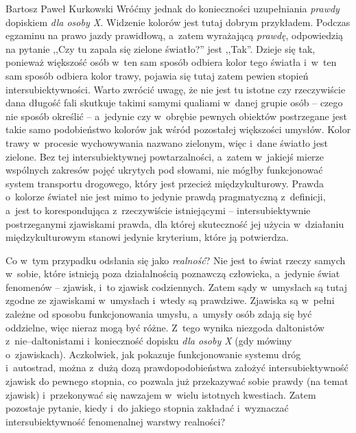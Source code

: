 \begin{artplenv}{Bartosz Paweł Kurkowski}
Wróćmy jednak do konieczności uzupełniania \textit{prawdy} dopiskiem \textit{dla osoby X.} Widzenie kolorów jest tutaj
dobrym przykładem. Podczas egzaminu na prawo jazdy prawidłową, a~zatem wyrażającą \textit{prawdę}, odpowiedzią na
pytanie ,,Czy tu zapala się zielone światło?'' jest ,,Tak''. Dzieje się tak, ponieważ większość osób w~ten sam sposób
odbiera kolor tego światła i~w~ten sam sposób odbiera kolor trawy, pojawia się tutaj zatem pewien stopień
intersubiektywności. Warto zwrócić uwagę, że nie jest tu istotne czy rzeczywiście dana długość fali skutkuje takimi
samymi qualiami w~danej grupie osób -- czego nie sposób określić -- a~jedynie czy w~obrębie pewnych obiektów postrzegane
jest takie samo podobieństwo kolorów jak wśród pozostałej większości umysłów. Kolor trawy w~procesie wychowywania
nazwano zielonym, więc i~dane światło jest zielone. Bez tej intersubiektywnej powtarzalności, a~zatem w~jakiejś mierze
wspólnych zakresów pojęć ukrytych pod słowami, nie mógłby funkcjonować system transportu drogowego, który jest przecież
międzykulturowy. Prawda o~kolorze świateł nie jest mimo to jedynie prawdą pragmatyczną z~definicji, a~jest to
korespondująca z~rzeczywiście istniejącymi -- intersubiektywnie postrzeganymi zjawiskami prawda, dla której skuteczność
jej użycia w~działaniu międzykulturowym stanowi jedynie kryterium, które ją potwierdza.


Co w~tym przypadku odsłania się jako \textit{realność}? Nie jest to świat rzeczy samych w~sobie, które istnieją poza
działalnością poznawczą człowieka, a~jedynie świat fenomenów -- zjawisk, i~to zjawisk codziennych. Zatem sądy w~umysłach
są tutaj zgodne ze zjawiskami w~umysłach i~wtedy są prawdziwe. Zjawiska są w~pełni zależne od sposobu funkcjonowania
umysłu, a~umysły osób zdają się być oddzielne, więc nieraz mogą być różne. Z~tego wynika niezgoda
daltonistów z~nie–daltonistami i~konieczność dopisku \textit{dla osoby X} (gdy mówimy o~zjawiskach). Aczkolwiek, jak pokazuje
funkcjonowanie systemu dróg i~autostrad, można z~dużą dozą prawdopodobieństwa założyć intersubiektywność zjawisk do
pewnego stopnia, co pozwala już przekazywać sobie prawdy (na temat zjawisk) i~przekonywać się nawzajem w~wielu
istotnych kwestiach. Zatem pozostaje pytanie, kiedy i~do jakiego stopnia zakładać i~wyznaczać intersubiektywność
fenomenalnej warstwy realności?



\end{artplenv}
